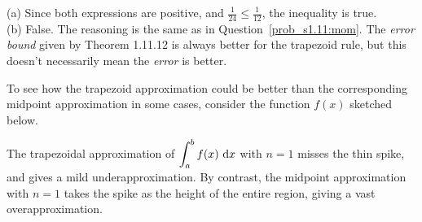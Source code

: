 \begin{solution}
\noindent (a) Since both expressions are positive, and $\frac{1}{24} \leq \frac{1}{12}$, the inequality is true.\\

\noindent (b) False. The reasoning is the same as in Question~\ref{prob_s1.11:mom}. The \emph{error bound} given by Theorem 1.11.12 is always better for the trapezoid rule, but this doesn't necessarily mean the \emph{error} is better.

To see how the trapezoid approximation could be better than the corresponding midpoint approximation in some cases, consider the function $f(x)$ sketched below.
\begin{center}
\end{center}

The trapezoidal approximation of $\displaystyle\int_a^b f(x)~\mathrm{d}x$ with $n=1$ misses the thin spike, and gives a mild underapproximation. By contrast, the midpoint approximation with $n=1$ takes the spike as the height of the entire region, giving a vast overapproximation.

\begin{center}
\hspace{2cm}
\end{center}

\end{solution}



